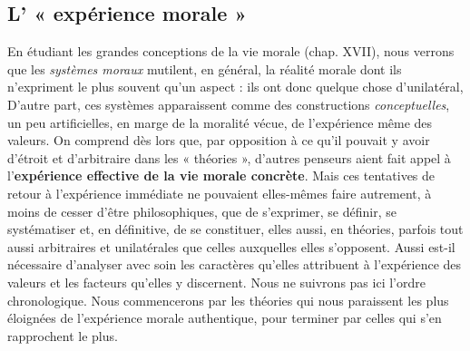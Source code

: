 \subsection{L’ « expérience morale »}%
En étudiant les grandes conceptions
de la vie morale (chap. XVII), nous verrons que les {\it systèmes
moraux} mutilent, en général, la réalité morale dont ils n’expriment
le plus souvent qu’un aspect : ils ont donc quelque chose d’unilatéral,
D'autre part, ces systèmes apparaissent comme des constructions
{\it conceptuelles}, un peu artificielles, en marge de la moralité vécue, de
l'expérience même des valeurs. On comprend dès lors que, par opposition
à ce qu’il pouvait y avoir d'étroit et d’arbitraire dans les
« théories », d’autres penseurs aient fait appel à l’{\bf expérience effective
de la vie morale concrète}. Mais ces tentatives de retour à l'expérience
immédiate ne pouvaient elles-mêmes faire autrement, à moins de
cesser d’être philosophiques, que de s’exprimer, se définir, se systématiser
et, en définitive, de se constituer, elles aussi, en théories,
parfois tout aussi arbitraires et unilatérales que celles auxquelles
elles s’opposent. Aussi est-il nécessaire d’analyser avec soin les caractères
qu’elles attribuent à l’expérience des valeurs et les facteurs
qu’elles y discernent. Nous ne suivrons pas ici l’ordre chronologique.
Nous commencerons par les théories qui nous paraissent les plus
éloignées de l'expérience morale authentique, pour terminer par
celles qui s’en rapprochent le plus.

